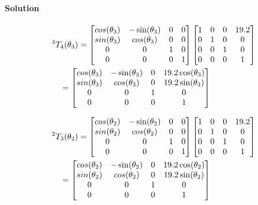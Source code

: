\documentclass[twocolumn]{article}
\begin{document}
\paragraph*{Solution}
\begin{align}
  &{}^3T_4(\theta_3) =
                      \begin{bmatrix}
                        cos(\theta_3) & -\sin(\theta_3) & 0 & 0 \\
                        sin(\theta_3) & cos(\theta_3) & 0 & 0 \\
                        0 & 0 & 1 & 0 \\
                        0 & 0 & 0 & 1
                      \end{bmatrix}
                      \begin{bmatrix}
    1 & 0 & 0 & 19.2 \\
    0 & 1 & 0 & 0 \\
    0 & 0 & 1 & 0 \\
    0 & 0 & 0 & 1
  \end{bmatrix}
                \notag\\
  &\quad= \begin{bmatrix}
    cos(\theta_3) & -\sin(\theta_3) & 0 & 19.2\cos(\theta_3) \\
    sin(\theta_3) & cos(\theta_3) & 0 & 19.2\sin(\theta_3) \\
    0 & 0 & 1 & 0 \\
    0 & 0 & 0 & 1
  \end{bmatrix}
\end{align}

\begin{align}
  &{}^2T_3(\theta_2) =
    \begin{bmatrix}
      cos(\theta_2) & -\sin(\theta_2) & 0 & 0 \\
      sin(\theta_2) & cos(\theta_2) & 0 & 0 \\
      0 & 0 & 1 & 0 \\
      0 & 0 & 0 & 1
    \end{bmatrix}
                  \begin{bmatrix}
                    1 & 0 & 0 & 19.2 \\
                    0 & 1 & 0 & 0 \\
                    0 & 0 & 1 & 0 \\
                    0 & 0 & 0 & 1
                  \end{bmatrix}
                                \notag\\
  &\quad= \begin{bmatrix}
    cos(\theta_2) & -\sin(\theta_2) & 0 & 19.2\cos(\theta_2) \\
    sin(\theta_2) & cos(\theta_2) & 0 & 19.2\sin(\theta_2) \\
    0 & 0 & 1 & 0 \\
    0 & 0 & 0 & 1
  \end{bmatrix}
\end{align}
\end{document}
